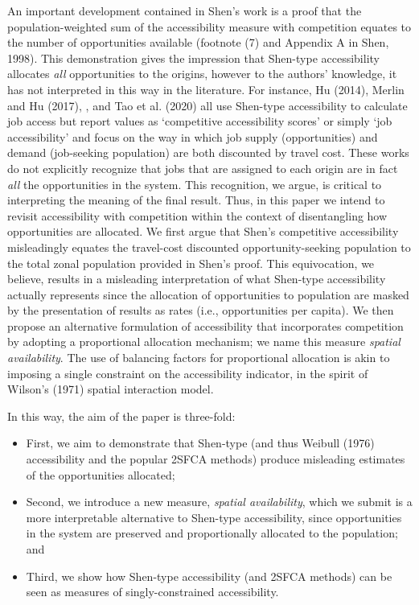 \documentclass[]{elsarticle} %
\begin{document}
An important development contained in Shen's work is a proof that the
population-weighted sum of the accessibility measure with competition
equates to the number of opportunities available (footnote (7) and
Appendix A in Shen, 1998). This demonstration gives the impression that
Shen-type accessibility allocates \emph{all} opportunities to the
origins, however to the authors' knowledge, it has not interpreted in
this way in the literature. For instance, Hu (2014), Merlin and Hu
(2017), , and Tao et al. (2020) all use Shen-type accessibility to
calculate job access but report values as `competitive accessibility
scores' or simply `job accessibility' and focus on the way in which job
supply (opportunities) and demand (job-seeking population) are both
discounted by travel cost. These works do not explicitly recognize that
jobs that are assigned to each origin are in fact \emph{all} the
opportunities in the system. This recognition, we argue, is critical to
interpreting the meaning of the final result. Thus, in this paper we
intend to revisit accessibility with competition within the context of
disentangling how opportunities are allocated. We first argue that
Shen's competitive accessibility misleadingly equates the travel-cost
discounted opportunity-seeking population to the total zonal population
provided in Shen's proof. This equivocation, we believe, results in a
misleading interpretation of what Shen-type accessibility actually
represents since the allocation of opportunities to population are
masked by the presentation of results as rates (i.e., opportunities per
capita). We then propose an alternative formulation of accessibility
that incorporates competition by adopting a proportional allocation
mechanism; we name this measure \emph{spatial availability}. The use of
balancing factors for proportional allocation is akin to imposing a
single constraint on the accessibility indicator, in the spirit of
Wilson's (1971) spatial interaction model.

In this way, the aim of the paper is three-fold:

\begin{itemize}
\item
  First, we aim to demonstrate that Shen-type (and thus Weibull (1976)
  accessibility and the popular 2SFCA methods) produce misleading
  estimates of the opportunities allocated;
\item
  Second, we introduce a new measure, \emph{spatial availability}, which
  we submit is a more interpretable alternative to Shen-type
  accessibility, since opportunities in the system are preserved and
  proportionally allocated to the population; and
\item
  Third, we show how Shen-type accessibility (and 2SFCA methods) can be
  seen as measures of singly-constrained accessibility.
\end{itemize}
\end{document}
